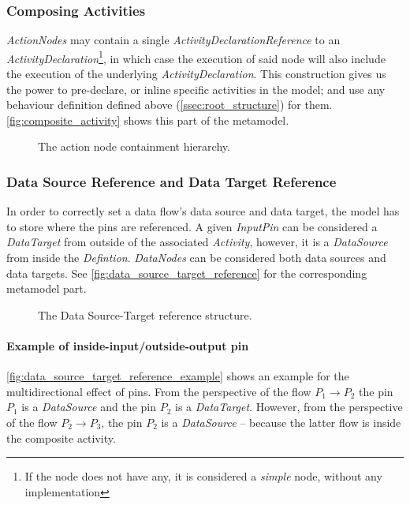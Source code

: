\subsubsection*{Composing Activities}

\emph{ActionNodes} may contain a single \emph{ActivityDeclarationReference} to an \emph{ActivityDeclaration}\footnote{If the node does not have any, it is considered a \emph{simple} node, without any implementation}, in which case the execution of said node will also include the execution of the underlying \emph{ActivityDeclaration}. This construction gives us the power to pre-declare, or inline specific activities in the model; and use any behaviour definition defined above (\autoref{ssec:root_structure})  for them. \autoref{fig:composite_activity} shows this part of the metamodel.

\begin{figure}[!ht]
	\centering
	
	\caption{The action node containment hierarchy.}
	\label{fig:composite_activity}
\end{figure}

\subsubsection*{Data Source Reference and Data Target Reference}

In order to correctly set a data flow's data source and data target, the model has to store where the pins are referenced. A given \emph{InputPin} can be considered a \emph{DataTarget} from outside of the associated \emph{Activity}, however, it is a \emph{DataSource} from inside the \emph{Defintion}. \emph{DataNodes} can be considered both data sources and data targets. See \autoref{fig:data_source_target_reference} for the corresponding metamodel part.

\begin{figure}[!ht]
	\centering
	
	\caption{The Data Source-Target reference structure.}
	\label{fig:data_source_target_reference}
\end{figure}

\paragraph{Example of inside-input/outside-output pin} \autoref{fig:data_source_target_reference_example} shows an example for the multidirectional effect of pins. From the perspective of the flow \(P_1 \rightarrow P_2\) the pin \(P_1\) is a \emph{DataSource} and the pin \(P_2\) is a \emph{DataTarget}. However, from the perspective of the flow \(P_2 \rightarrow P_3\), the pin \(P_2\) is a \emph{DataSource} -- because the latter flow is inside the composite activity.

